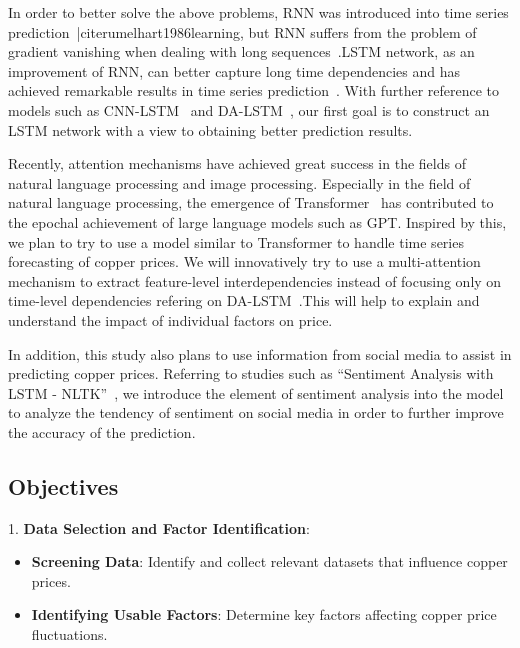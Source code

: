 \documentclass[project-plan]{report-template}
\begin{document}
\noindent In order to better solve the above problems, RNN was introduced into time series prediction~|cite{rumelhart1986learning}, but RNN suffers from the problem of gradient vanishing when dealing with long sequences~\cite{bengio1994learning}.LSTM network, as an improvement of RNN, can better capture long time dependencies and has achieved remarkable results in time series prediction~\cite{hochreiter1997long}. With further reference to models such as CNN-LSTM~\cite{shi2015convolutional, 10159241} and DA-LSTM~\cite{qin2017dualstage}, our first goal is to construct an LSTM network with a view to obtaining better prediction results.

\noindent Recently, attention mechanisms have achieved great success in the fields of natural language processing and image processing. Especially in the field of natural language processing, the emergence of Transformer~\cite{li2019enhancing, vaswani2017attention} has contributed to the epochal achievement of large language models such as GPT. Inspired by this, we plan to try to use a model similar to Transformer to handle time series forecasting of copper prices. We will innovatively try to use a multi-attention mechanism to extract feature-level interdependencies instead of focusing only on time-level dependencies refering on DA-LSTM~\cite{qin2017dualstage}.This will help to explain and understand the impact of individual factors on price.

\noindent In addition, this study also plans to use information from social media to assist in predicting copper prices. Referring to studies such as “Sentiment Analysis with LSTM - NLTK”~\cite{8848203}, we introduce the element of sentiment analysis into the model to analyze the tendency of sentiment on social media in order to further improve the accuracy of the prediction.

\subsection{Objectives}

1. \textbf{Data Selection and Factor Identification}:
   \begin{itemize}
      \item \textbf{Screening Data}: Identify and collect relevant datasets that influence copper prices.
      \item \textbf{Identifying Usable Factors}: Determine key factors affecting copper price fluctuations.
   \end{itemize}
\end{document}
